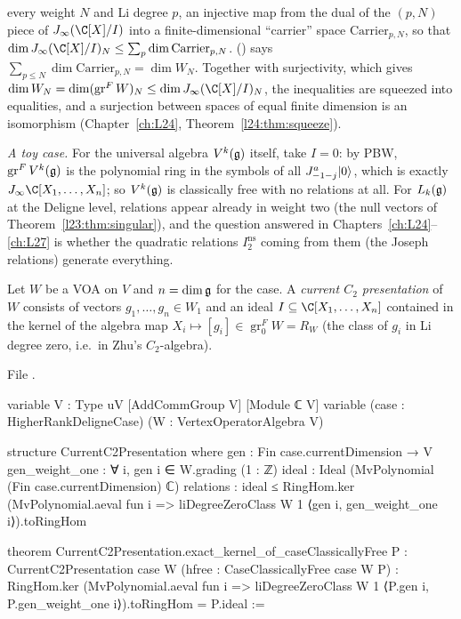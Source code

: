 \begin{itemize}
  every weight $N$ and Li degree $p$, an injective map from the dual of the $(p,N)$ piece of $J_\infty(\C[X]/I)$ into a finite-dimensional
  ``carrier'' space $\mathrm{Carrier}_{p,N}$, so that $\dim J_\infty(\C[X]/I)_N\le\sum_p\dim\mathrm{Carrier}_{p,N}$.
   () says $\sum_{p\le N}\dim\mathrm{Carrier}_{p,N}=\dim W_N$. Together with surjectivity, which gives
  $\dim W_N=\dim(\operatorname{gr}^FW)_N\le\dim J_\infty(\C[X]/I)_N$, the inequalities are squeezed into equalities, and a surjection between spaces
  of equal finite dimension is an isomorphism (Chapter~\ref{ch:L24}, Theorem~\ref{l24:thm:squeeze}).
\end{itemize}
\emph{A toy case.} For the universal algebra $V^k(\mathfrak g)$ itself, take $I=0$: by PBW, $\operatorname{gr}^FV^k(\mathfrak g)$ is the polynomial ring
in the symbols of all $J^a_{-1-j}|0\rangle$, which is exactly $J_\infty\C[X_1,\dots,X_n]$; so $V^k(\mathfrak g)$ is classically free with no
relations at all. For $L_k(\mathfrak g)$ at the Deligne level, relations appear already in weight two (the null vectors of
Theorem~\ref{l23:thm:singular}), and the question answered in Chapters~\ref{ch:L24}--\ref{ch:L27} is whether the quadratic relations
$I_2^{\mathrm{ns}}$ coming from them (the Joseph relations) generate everything.

\begin{definition}\label{l23:def:c2pres}
Let $W$ be a VOA on $V$ and $n=\dim\mathfrak g$ for the case. A \emph{current $C_2$ presentation} of $W$ consists of vectors
$g_1,\dots,g_n\in W_1$ and an ideal $I\subseteq\C[X_1,\dots,X_n]$ contained in the kernel of the algebra map
$X_i\mapsto[g_i]\in\operatorname{gr}^F_0W=R_W$ (the class of $g_i$ in Li degree zero, i.e.\ in Zhu's $C_2$-algebra).
\end{definition}
\noindent File .
\begin{leancode}
variable {V : Type uV} [AddCommGroup V] [Module ℂ V]
variable (case : HigherRankDeligneCase) (W : VertexOperatorAlgebra V)

structure CurrentC2Presentation where
  gen : Fin case.currentDimension → V
  gen_weight_one : ∀ i, gen i ∈ W.grading (1 : ℤ)
  ideal : Ideal (MvPolynomial (Fin case.currentDimension) ℂ)
  relations : ideal ≤ RingHom.ker
      (MvPolynomial.aeval fun i =>
        liDegreeZeroClass W 1 ⟨gen i, gen_weight_one i⟩).toRingHom

theorem CurrentC2Presentation.exact_kernel_of_caseClassicallyFree
    {P : CurrentC2Presentation case W} (hfree : CaseClassicallyFree case W P) :
    RingHom.ker
        (MvPolynomial.aeval fun i =>
          liDegreeZeroClass W 1 ⟨P.gen i, P.gen_weight_one i⟩).toRingHom =
      P.ideal :=
\end{leancode}

